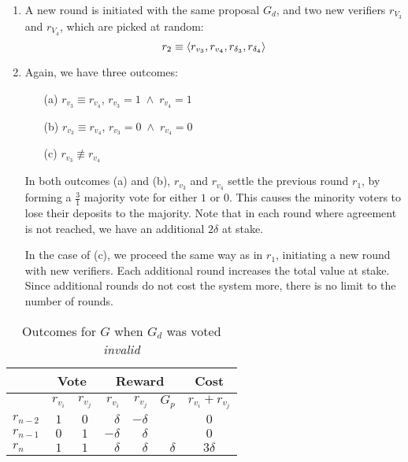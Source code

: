 \begin{enumerate}
    \item A new round is initiated with the same proposal $G_d$, and two new
        verifiers $r_{V_3}$ and $r_{V_4}$, which are picked at random:
        \begin{equation*}
            r_2 \equiv \langle r_{v_3}, r_{v_4}, r_{\delta_3}, r_{\delta_4} \rangle
        \end{equation*}
    \item Again, we have three outcomes:
        \smallskip
        \begin{enumerate}
            \item[(a)] $r_{v_3} \equiv r_{v_4}$, \qquad $r_{v_3} = 1 \; \wedge \; r_{v_4} = 1$
            \item[(b)] $r_{v_3} \equiv r_{v_4}$, \qquad $r_{v_3} = 0 \; \wedge \; r_{v_4} = 0$
            \item[(c)] $r_{v_3} \not\equiv r_{v_4}$
        \end{enumerate}
        \smallskip
        In both outcomes (a) and (b), $r_{v_3}$ and $r_{v_4}$ settle the
        previous round $r_1$, by forming a $\frac{3}{1}$ majority vote for
        either $1$ or $0$. This causes the minority voters to lose their
        deposits to the majority. Note that in each round where agreement is
        not reached, we have an additional $2\delta$ at stake.

        In the case of (c), we proceed the same way as in $r_1$, initiating a
        new round with new verifiers.  Each additional round increases the
        total value at stake. Since additional rounds do not cost the system
        more, there is no limit to the number of rounds.
\end{enumerate}

\begin{table}[hbt]
    \caption{Outcomes for $G$ when $G_d$ was voted \emph{invalid}}
    \begin{tabular}{lccrrrc}
    \toprule
        \hspace   & \multicolumn{2}{c}{Vote} & \multicolumn{3}{c}{Reward} & Cost                    \\
    \midrule
        \hspace   & $r_{v_i}$  & $r_{v_j}$   & $r_{v_i}$ & $r_{v_j}$ & $G_p$    & $r_{v_i}+r_{v_j}$ \\
    \addlinespace[0.5em]
        $r_{n-2}$ & $1$        & $0$         & $\delta$  & $-\delta$ &          & $0$               \\
        $r_{n-1}$ & $0$        & $1$         & $-\delta$ & $\delta$  &          & $0$               \\
        $r_{n}$   & $1$        & $1$         & $\delta$  & $\delta$  & $\delta$ & $3\delta$         \\
    \bottomrule
    \end{tabular}
\end{table}

